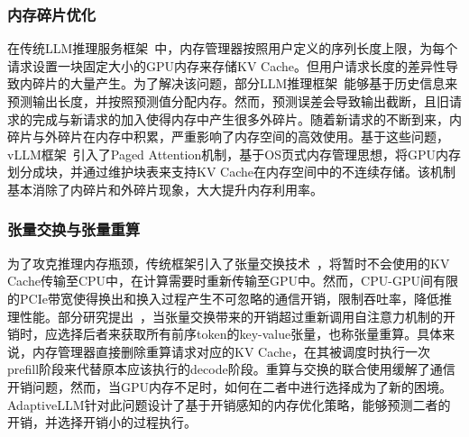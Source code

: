 \subsubsection{内存碎片优化}

在传统LLM推理服务框架~\cite{Swapping}中，内存管理器按照用户定义的序列长度上限，为每个请求设置一块固定大小的GPU内存来存储KV Cache。但用户请求长度的差异性导致内碎片的大量产生。为了解决该问题，部分LLM推理框架~\cite{Output-Length-Prediction}能够基于历史信息来预测输出长度，并按照预测值分配内存。然而，预测误差会导致输出截断，且旧请求的完成与新请求的加入使得内存中产生很多外碎片。随着新请求的不断到来，内碎片与外碎片在内存中积累，严重影响了内存空间的高效使用。基于这些问题，vLLM框架~\cite{vLLM}引入了Paged Attention机制，基于OS页式内存管理思想，将GPU内存划分成块，并通过维护块表来支持KV Cache在内存空间中的不连续存储。该机制基本消除了内碎片和外碎片现象，大大提升内存利用率。

\subsubsection{张量交换与张量重算}

为了攻克推理内存瓶颈，传统框架引入了张量交换技术~\cite{Swapping, vLLM, LightLLM}，将暂时不会使用的KV Cache传输至CPU中，在计算需要时重新传输至GPU中。然而，CPU-GPU间有限的PCIe带宽使得换出和换入过程产生不可忽略的通信开销，限制吞吐率，降低推理性能。部分研究提出~\cite{Recomputation}，当张量交换带来的开销超过重新调用自注意力机制的开销时，应选择后者来获取所有前序token的key-value张量，也称张量重算。具体来说，内存管理器直接删除重算请求对应的KV Cache，在其被调度时执行一次prefill阶段来代替原本应该执行的decode阶段。重算与交换的联合使用缓解了通信开销问题，然而，当GPU内存不足时，如何在二者中进行选择成为了新的困境。AdaptiveLLM针对此问题设计了基于开销感知的内存优化策略，能够预测二者的开销，并选择开销小的过程执行。




